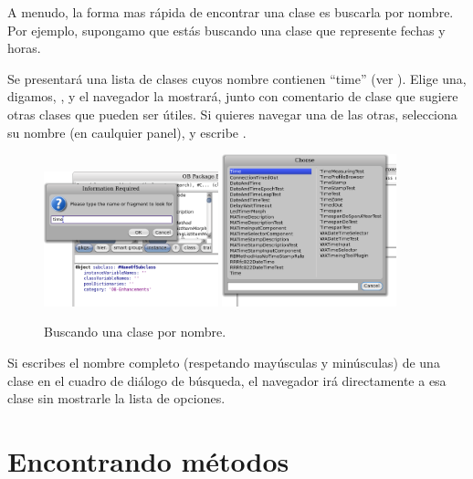 \documentclass[a4paper,10pt,twoside]{book}
\begin{document}
A menudo, la forma mas r\'apida de encontrar una clase es buscarla por nombre. Por ejemplo, supongamo que est\'as buscando una clase que represente fechas y horas.

\noindent
Se presentar\'a una lista de clases cuyos nombre contienen ``time'' (ver ). Elige una, digamos, , y el navegador la mostrar\'a, junto con comentario de clase que sugiere otras clases que pueden ser \'utiles. Si quieres navegar una de las otras, selecciona su nombre (en caulquier panel), y escribe .

\begin{figure}[hbt]
\centerline{
	\includegraphics[width=0.45\textwidth]{FindIt}
	\hspace{1cm}
	\includegraphics[width=0.45\textwidth]{TimeClasses}
}
\caption{Buscando una clase por nombre.
}
\end{figure}

Si escribes el nombre completo (respetando may\'usculas y min\'usculas) de una clase en el cuadro de di\'alogo de b\'usqueda, el navegador ir\'a directamente a esa clase sin mostrarle la lista de opciones.

\section{Encontrando m\'etodos}
\end{document}
